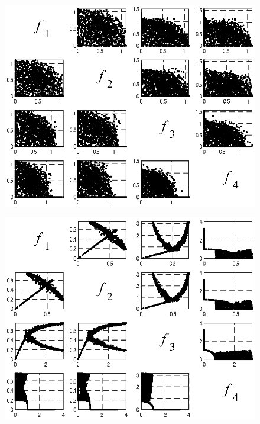 \begin{figure}[htbp]
\begin{center}
\begin{minipage}{0.45\textwidth}
\begin{center}
            \end{center}
        \end{minipage}
        \begin{minipage}{0.45\textwidth}
            \begin{center}
                \includegraphics[width=1\textwidth,keepaspectratio=true]{fig/robust_result_pareto_matrix_benchmark_DTLZ2.eps}\\\vspace{-5mm}{\small (c)DTLZ2問題}
            \end{center}
        \end{minipage}
        \begin{minipage}{0.45\textwidth}
            \begin{center}
                \includegraphics[width=1\textwidth,keepaspectratio=true]{fig/robust_result_pareto_matrix_benchmark_DTLZ5.eps}\\\vspace{-5mm}{\small (d)DTLZ5問題}

\end{center}
\end{minipage}
\end{center}
\end{figure}
